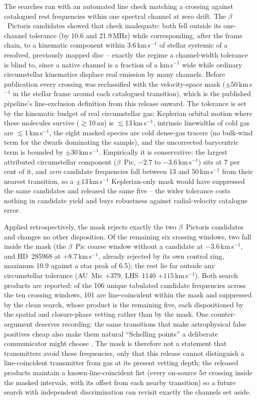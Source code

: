\documentclass{openjournal}
\begin{document}
The searches ran with an automated line check matching a crossing
against catalogued rest frequencies within one spectral channel at
zero drift. The $\beta$~Pictoris candidates
showed that check inadequate: both fell outside its one-channel
tolerance (by 10.6 and 21.9\,MHz) while corresponding, after the
frame chain, to a kinematic component within 3.6\,km\,s$^{-1}$ of
stellar systemic of a resolved, previously mapped disc -- exactly the
regime a channel-width tolerance is blind to, since a native channel
is a fraction of a km\,s$^{-1}$ wide while ordinary circumstellar
kinematics displace real emission by many channels. Before
publication every crossing was reclassified with the velocity-space
mask ($\pm50$\,km\,s$^{-1}$ in the stellar frame around each
catalogued transition), which is the published pipeline's
line-exclusion definition from this release onward. The tolerance is
set by the kinematic budget of real circumstellar gas: Keplerian
orbital motion where these molecules survive ($\gtrsim$10\,au) is
$\lesssim$13\,km\,s$^{-1}$, intrinsic linewidths of cold gas are
$\lesssim$1\,km\,s$^{-1}$, the eight masked species are cold
dense-gas tracers (no bulk-wind term for the dwarfs dominating the
sample), and the uncorrected barycentric term is bounded by
$\pm$30\,km\,s$^{-1}$. Empirically it is conservative: the largest
attributed circumstellar component ($\beta$~Pic, $-2.7$ to
$-3.6$\,km\,s$^{-1}$) sits at 7 per cent of it, and \emph{zero}
candidate frequencies fall between 13 and 50\,km\,s$^{-1}$ from their
nearest transition, so a $\pm13$\,km\,s$^{-1}$ Keplerian-only mask
would have suppressed the same candidates and released the same five
-- the wider tolerance costs nothing in candidate yield and buys
robustness against radial-velocity catalogue error.

Applied retrospectively, the mask rejects exactly the two
$\beta$~Pictoris candidates and changes no other disposition. Of the
remaining six crossing windows, two fall inside the mask (the
$\beta$~Pic coarse window without a candidate at
$-3.6$\,km\,s$^{-1}$, and HD~285968 at $+8.7$\,km\,s$^{-1}$, already
rejected by its own control ring, maximum 10.9 against a star peak of
6.5); the rest lie far outside any circumstellar tolerance (AU~Mic
$+379$, LHS~1140 $+115$\,km\,s$^{-1}$). Both search products are
reported: of the 106 unique tabulated candidate frequencies across
the ten crossing windows, 101 are line-coincident within the mask and
suppressed by the clean search, whose product is the remaining five,
each dispositioned by the spatial and closure-phase vetting rather
than by the mask. One counter-argument deserves recording: the same
transitions that make astrophysical false positives cheap also make
them natural ``Schelling points'' a deliberate communicator might
choose \citep{CocconiMorrison1959}. The mask is therefore not a
statement that transmitters avoid these frequencies, only that this
release cannot distinguish a line-coincident transmitter from gas at
its present vetting depth; the released products maintain a
known-line-coincident list (every on-source $5\sigma$ crossing inside
the masked intervals, with its offset from each nearby transition) so
a future search with independent discrimination can revisit exactly
the channels set aside.
\end{document}
